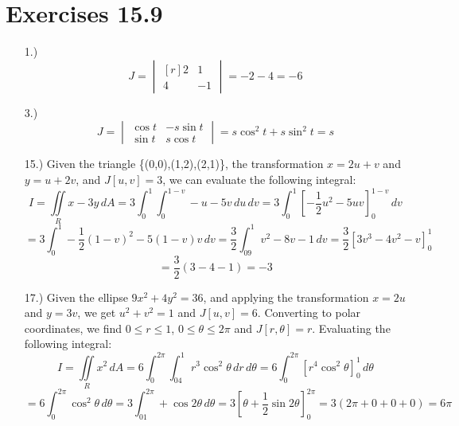 \documentclass[12pt]{article}
\newcommand{\bracks}[1]{\left[#1\right]}
\newcommand{\parns}[1]{\left(#1\right)}
\begin{document}
\section*{Exercises 15.9}
\begin{itemize}
    \item [1.)] \[J=\begin{vmatrix*}[r]
        2 & 1 \\
        4 & -1
    \end{vmatrix*}=-2-4=-6\]

    \item [3.)] \[J=\begin{vmatrix}
        \cos t & -s\sin t \\
        \sin t & s\cos t
    \end{vmatrix}=s\cos^2t+s\sin^2t=s\]

    \item [15.)] Given the triangle \{(0,0),(1,2),(2,1)\}, the transformation $x=2u+v$ and $y=u+2v$, and $J[u,v]=3$, we can evaluate the following integral:
    \[I=\iint\limits_{R}x-3y\,dA=3\int^1_0\int^{1-v}_0-u-5v\,du\,dv=3\int^1_0\bracks{-\frac{1}{2}u^2-5uv}^{1-v}_0\,dv\]
    \[=3\int^1_0-\frac{1}{2}(1-v)^2-5(1-v)v\,dv=\frac{3}{2}\int^1_09v^2-8v-1\,dv=\frac{3}{2}\bracks{3v^3-4v^2-v}^1_0\]
    \[=\frac{3}{2}\parns{3-4-1}=-3\]

    \item [17.)] Given the ellipse $9x^2+4y^2=36$, and applying the transformation $x=2u$ and $y=3v$, we get $u^2+v^2=1$ and $J[u,v]=6$. Converting to polar coordinates, we find $0\leq r\leq 1$, $0\leq\theta\leq2\pi$ and $J[r,\theta]=r$. Evaluating the following integral:
    \[I=\iint\limits_{R}x^2\,dA=6\int^{2\pi}_0\int^1_04r^3\cos^2\theta\,dr\,d\theta=6\int^{2\pi}_0\bracks{r^4\cos^2\theta}^1_0\,d\theta\]
    \[=6\int^{2\pi}_0\cos^2\theta\,d\theta=3\int^{2\pi}_01+\cos2\theta\,d\theta=3\bracks{\theta+\frac{1}{2}\sin2\theta}^{2\pi}_0=3\parns{2\pi+0+0+0}=6\pi\]

\end{itemize}
\end{document}
